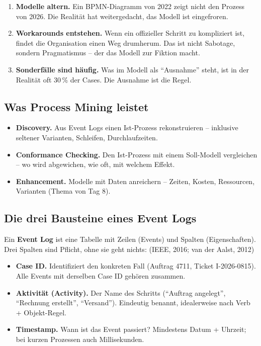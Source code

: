 \documentclass[11pt,a4paper,oneside]{article}
\newcommand{\fachbegriff}[1]{\textbf{#1}}
\newcommand{\quelle}[1]{{\footnotesize\color{lpGray}(#1)}}
\begin{document}
\begin{enumerate}
  \item \fachbegriff{Modelle altern.} Ein BPMN-Diagramm von 2022 zeigt nicht den Prozess von 2026. Die Realität hat weitergedacht, das Modell ist eingefroren.
  \item \fachbegriff{Workarounds entstehen.} Wenn ein offizieller Schritt zu kompliziert ist, findet die Organisation einen Weg drumherum. Das ist nicht Sabotage, sondern Pragmatismus -- der das Modell zur Fiktion macht.
  \item \fachbegriff{Sonderfälle sind häufig.} Was im Modell als ``Ausnahme'' steht, ist in der Realität oft 30\,\% der Cases. Die Ausnahme ist die Regel.
\end{enumerate}

\subsection{Was Process Mining leistet}

\begin{itemize}
  \item \fachbegriff{Discovery.} Aus Event Logs einen Ist-Prozess rekonstruieren -- inklusive seltener Varianten, Schleifen, Durchlaufzeiten.
  \item \fachbegriff{Conformance Checking.} Den Ist-Prozess mit einem Soll-Modell vergleichen -- wo wird abgewichen, wie oft, mit welchem Effekt.
  \item \fachbegriff{Enhancement.} Modelle mit Daten anreichern -- Zeiten, Kosten, Ressourcen, Varianten (Thema von Tag 8).
\end{itemize}

\subsection{Die drei Bausteine eines Event Logs}

Ein \fachbegriff{Event Log} ist eine Tabelle mit Zeilen (Events) und Spalten (Eigenschaften). Drei Spalten sind Pflicht, ohne sie geht nichts: \quelle{IEEE, 2016; van der Aalst, 2012}

\begin{itemize}
  \item \fachbegriff{Case ID.} Identifiziert den konkreten Fall (Auftrag 4711, Ticket I-2026-0815). Alle Events mit derselben Case ID gehören zusammen.
  \item \fachbegriff{Aktivität (Activity).} Der Name des Schritts (``Auftrag angelegt'', ``Rechnung erstellt'', ``Versand''). Eindeutig benannt, idealerweise nach Verb + Objekt-Regel.
  \item \fachbegriff{Timestamp.} Wann ist das Event passiert? Mindestens Datum + Uhrzeit; bei kurzen Prozessen auch Millisekunden.
\end{itemize}
\end{document}
